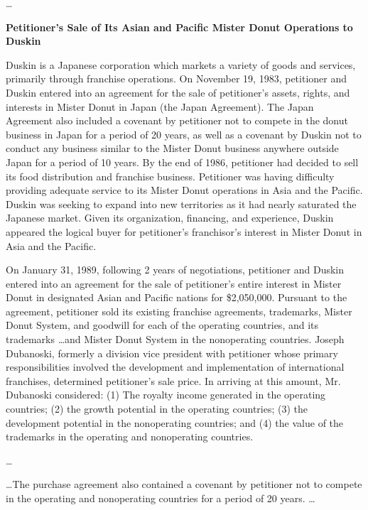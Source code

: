 \begin{select}
\ldots

\begin{center} \textbf{Petitioner's Sale of Its Asian and Pacific Mister Donut Operations to Duskin}
\end{center}
Duskin is a Japanese corporation which markets a variety of goods and services, primarily through franchise
operations. On November 19, 1983, petitioner and Duskin entered into an agreement for the sale of petitioner's assets,
rights, and interests in Mister Donut in Japan (the Japan Agreement). The Japan Agreement also included a covenant by
petitioner not to compete in the donut business in Japan for a period of 20 years, as well as a covenant by Duskin
not to conduct any business similar to the Mister Donut business anywhere outside Japan for a period of 10 years. By the end of 1986, petitioner had decided to sell its food distribution and franchise business. Petitioner was having difficulty providing adequate service to its Mister Donut operations in Asia and the Pacific. Duskin was seeking
to expand into new territories as it had nearly saturated the Japanese market. Given its organization, financing, and
experience, Duskin appeared the logical buyer for petitioner's franchisor's interest in Mister Donut in Asia and the Pacific.

On January 31, 1989, following 2 years of negotiations, petitioner and Duskin entered into an agreement for the sale
of petitioner's entire interest in Mister Donut in designated Asian and Pacific nations for \$2,050,000. Pursuant to the
agreement, petitioner sold its existing franchise agreements, trademarks, Mister Donut System, and goodwill for each of
the operating countries, and its trademarks \ldots and Mister Donut System in the nonoperating countries. Joseph Dubanoski, formerly a division vice president with petitioner whose primary responsibilities involved the development and
implementation of international franchises, determined petitioner's sale price. In arriving at this amount, Mr. Dubanoski
considered: (1) The royalty income generated in the operating countries; (2) the growth potential in the operating
countries; (3) the development potential in the nonoperating countries; and (4) the value of the trademarks in the operating and nonoperating countries.

\ldots 

\ldots The purchase agreement also contained a covenant by petitioner not to compete in the operating and
nonoperating countries for a period of 20 years. \ldots 


\end{select}
